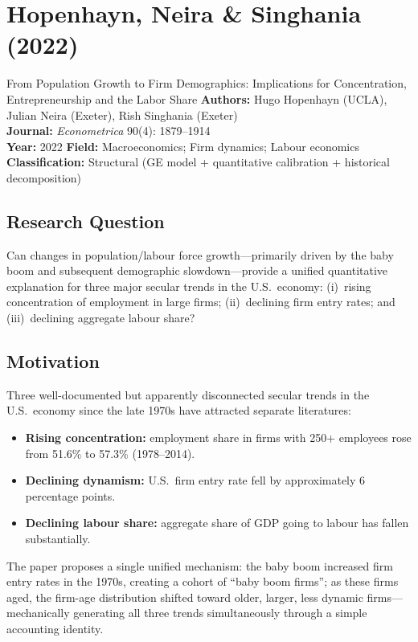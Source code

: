 \chapter{Hopenhayn, Neira \& Singhania (2022)}

\begin{paperbox}{From Population Growth to Firm Demographics: Implications
for Concentration, Entrepreneurship and the Labor Share}
\textbf{Authors:} Hugo Hopenhayn (UCLA), Julian Neira (Exeter),
Rish Singhania (Exeter)\\[3pt]
\textbf{Journal:} \textit{Econometrica} 90(4): 1879--1914\\[3pt]
\textbf{Year:} 2022 \quad\textbf{Field:} Macroeconomics; Firm dynamics;
Labour economics\\[3pt]
\textbf{Classification:} Structural (GE model + quantitative calibration
+ historical decomposition)
\end{paperbox}

\section{Research Question}

Can changes in population/labour force growth---primarily driven by the baby
boom and subsequent demographic slowdown---provide a unified quantitative
explanation for three major secular trends in the U.S.\ economy: (i)~rising
concentration of employment in large firms; (ii)~declining firm entry rates;
and (iii)~declining aggregate labour share?

\section{Motivation}

Three well-documented but apparently disconnected secular trends in the U.S.\
economy since the late 1970s have attracted separate literatures:
\begin{itemize}
  \item \textbf{Rising concentration:} employment share in firms with
    250+ employees rose from 51.6\% to 57.3\% (1978--2014).
  \item \textbf{Declining dynamism:} U.S.\ firm entry rate fell by
    approximately 6 percentage points.
  \item \textbf{Declining labour share:} aggregate share of GDP going
    to labour has fallen substantially.
\end{itemize}
The paper proposes a single unified mechanism: the baby boom increased firm
entry rates in the 1970s, creating a cohort of ``baby boom firms''; as these
firms aged, the firm-age distribution shifted toward older, larger, less dynamic
firms---mechanically generating all three trends simultaneously through a simple
accounting identity.

